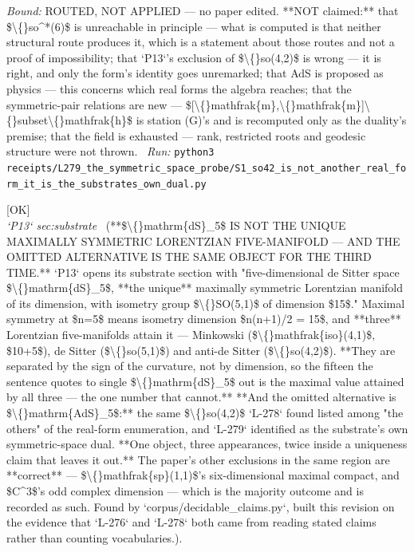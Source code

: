 \begin{description}
 \emph{Bound:} ROUTED, NOT APPLIED --- no paper edited. **NOT claimed:** that \$\textbackslash\{\}so\textasciicircum{}*(6)\$ is unreachable in principle --- what is computed is that neither structural route produces it, which is a statement about those routes and not a proof of impossibility; that `P13`'s exclusion of \$\textbackslash\{\}so(4,2)\$ is wrong --- it is right, and only the form's identity goes unremarked; that AdS is proposed as physics --- this concerns which real forms the algebra reaches; that the symmetric-pair relations are new --- \$[\textbackslash\{\}mathfrak\{m\},\textbackslash\{\}mathfrak\{m\}]\textbackslash\{\}subset\textbackslash\{\}mathfrak\{h\}\$ is station (G)'s and is recomputed only as the duality's premise; that the field is exhausted --- rank, restricted roots and geodesic structure were not thrown.
\ \emph{Run:} \texttt{python3 receipts/L279\_the\_symmetric\_space\_probe/S1\_so42\_is\_not\_another\_real\_form\_it\_is\_the\_substrates\_own\_dual.py}
\item[\label{rcpt:D1_ds5_is_not_the_unique_maximally_symmetric_lorentzian_five_manifold}\texttt{D1\_ds5\_is\_not\_the\_unique\_maximally\_symmetric\_lorentzian\_five\_manifold}]\hfill\textsf{[OK]}\\
\textit{`P13` sec:substrate} \ (**\$\textbackslash\{\}mathrm\{dS\}\_5\$ IS NOT THE UNIQUE MAXIMALLY SYMMETRIC LORENTZIAN FIVE-MANIFOLD --- AND THE OMITTED ALTERNATIVE IS THE SAME OBJECT FOR THE THIRD TIME.** `P13` opens its substrate section with "five-dimensional de Sitter space \$\textbackslash\{\}mathrm\{dS\}\_5\$, **the unique** maximally symmetric Lorentzian manifold of its dimension, with isometry group \$\textbackslash\{\}SO(5,1)\$ of dimension \$15\$." Maximal symmetry at \$n=5\$ means isometry dimension \$n(n+1)/2 = 15\$, and **three** Lorentzian five-manifolds attain it --- Minkowski (\$\textbackslash\{\}mathfrak\{iso\}(4,1)\$, \$10+5\$), de Sitter (\$\textbackslash\{\}so(5,1)\$) and anti-de Sitter (\$\textbackslash\{\}so(4,2)\$). **They are separated by the sign of the curvature, not by dimension, so the fifteen the sentence quotes to single \$\textbackslash\{\}mathrm\{dS\}\_5\$ out is the maximal value attained by all three --- the one number that cannot.** **And the omitted alternative is \$\textbackslash\{\}mathrm\{AdS\}\_5\$:** the same \$\textbackslash\{\}so(4,2)\$ `L-278` found listed among "the others" of the real-form enumeration, and `L-279` identified as the substrate's own symmetric-space dual. **One object, three appearances, twice inside a uniqueness claim that leaves it out.** The paper's other exclusions in the same region are **correct** --- \$\textbackslash\{\}mathfrak\{sp\}(1,1)\$'s six-dimensional maximal compact, and \$C\textasciicircum{}3\$'s odd complex dimension --- which is the majority outcome and is recorded as such. Found by `corpus/decidable\_claims.py`, built this revision on the evidence that `L-276` and `L-278` both came from reading stated claims rather than counting vocabularies.). 

\end{description}
